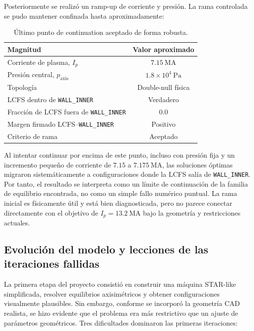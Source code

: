 \documentclass[11pt,a4paper]{article}
\begin{document}
Posteriormente se realizó un ramp-up de corriente y presión. La rama controlada se pudo
mantener confinada hasta aproximadamente:

\begin{table}[htbp]
\centering
\caption{Último punto de continuation aceptado de forma robusta.}
\label{tab:last_accepted_ramp_point}
\begin{tabular}{lc}
\toprule
\textbf{Magnitud} & \textbf{Valor aproximado} \\
\midrule
Corriente de plasma, $I_p$ & $7.15~\mathrm{MA}$ \\
Presión central, $p_{\mathrm{axis}}$ & $1.8\times 10^4~\mathrm{Pa}$ \\
Topología & Double-null física \\
LCFS dentro de \texttt{WALL\_INNER} & Verdadero \\
Fracción de LCFS fuera de \texttt{WALL\_INNER} & $0.0$ \\
Margen firmado LCFS--\texttt{WALL\_INNER} & Positivo \\
Criterio de rama & Aceptado \\
\bottomrule
\end{tabular}
\end{table}

Al intentar continuar por encima de este punto, incluso con presión fija y un incremento pequeño
de corriente de $7.15$ a $7.175~\mathrm{MA}$, las soluciones óptimas migraron sistemáticamente a
configuraciones donde la LCFS salía de \texttt{WALL\_INNER}. Por tanto, el resultado se interpreta
como un límite de continuación de la familia de equilibrio encontrada, no como un simple fallo
numérico puntual. La rama inicial es físicamente útil y está bien diagnosticada, pero no parece
conectar directamente con el objetivo de $I_p=13.2~\mathrm{MA}$ bajo la geometría y restricciones
actuales.

\subsection{Evolución del modelo y lecciones de las iteraciones fallidas}
La primera etapa del proyecto consistió en construir una máquina STAR-like simplificada,
resolver equilibrios axisimétricos y obtener configuraciones visualmente plausibles. Sin embargo,
conforme se incorporó la geometría CAD realista, se hizo evidente que el problema era más
restrictivo que un ajuste de parámetros geométricos. Tres dificultades dominaron las primeras
iteraciones:
\end{document}

